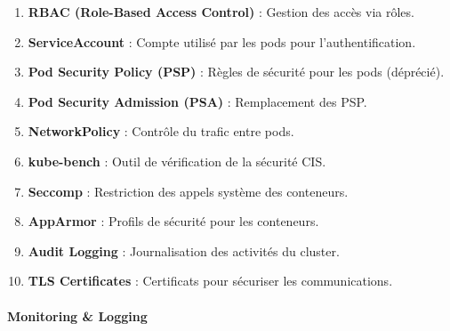 \documentclass[
  letterpaper,
  DIV=11,
  numbers=noendperiod]{scrartcl}
\makeatletter
\let\oldparagraph\paragraph
\renewcommand{\paragraph}{
    \@ifstar
      \xxxParagraphStar
      \xxxParagraphNoStar
  }
\newcommand{\xxxParagraphStar}[1]{\oldparagraph*{#1}\mbox{}}
\newcommand{\xxxParagraphNoStar}[1]{\oldparagraph{#1}\mbox{}}
\providecommand{\tightlist}{%
  \setlength{\itemsep}{0pt}\setlength{\parskip}{0pt}}\usepackage{longtable,booktabs,array}
\makeatother
\begin{document}
\begin{enumerate}
\def\labelenumi{\arabic{enumi}.}
\setcounter{enumi}{50}
\tightlist
\item
  \textbf{RBAC (Role-Based Access Control)} : Gestion des accès via
  rôles.\\
\item
  \textbf{ServiceAccount} : Compte utilisé par les pods pour
  l'authentification.\\
\item
  \textbf{Pod Security Policy (PSP)} : Règles de sécurité pour les pods
  (déprécié).\\
\item
  \textbf{Pod Security Admission (PSA)} : Remplacement des PSP.\\
\item
  \textbf{NetworkPolicy} : Contrôle du trafic entre pods.\\
\item
  \textbf{kube-bench} : Outil de vérification de la sécurité CIS.\\
\item
  \textbf{Seccomp} : Restriction des appels système des conteneurs.\\
\item
  \textbf{AppArmor} : Profils de sécurité pour les conteneurs.\\
\item
  \textbf{Audit Logging} : Journalisation des activités du cluster.\\
\item
  \textbf{TLS Certificates} : Certificats pour sécuriser les
  communications.
\end{enumerate}

\paragraph{\texorpdfstring{\textbf{Monitoring \&
Logging}}{Monitoring \& Logging}}\label{monitoring-logging}
\end{document}
